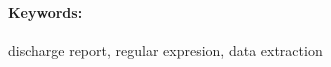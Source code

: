 \documentclass[12pt, twoside]{book}
\begin{document}
\paragraph*{Keywords:} discharge report, regular expresion, data extraction


%
%
%



\newpage 

\tableofcontents



\newpage 

\listoffigures


\mainmatter
\pagestyle{headings}


 

%





%











\newpage	

\backmatter

\thispagestyle{empty}
\clearpage


 




%


%
\end{document}
